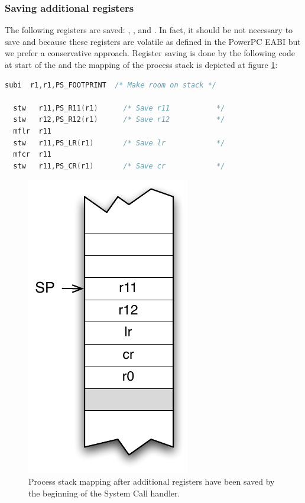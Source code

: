 
\subsubsection{Saving additional registers}

The following registers are saved: , ,  and . In fact, it should be not necessary to save  and  because these registers are volatile as defined in the PowerPC EABI \cite{PPCeabi} but we prefer a conservative approach. Register saving is done by the following code at start of the  and the mapping of the process stack is depicted at figure \ref{fig:stackSavingSC}:

\begin{lstlisting}[language=C]
  subi  r1,r1,PS_FOOTPRINT  /* Make room on stack */

  stw   r11,PS_R11(r1)      /* Save r11           */
  stw   r12,PS_R12(r1)      /* Save r12           */
  mflr  r11
  stw   r11,PS_LR(r1)       /* Save lr            */
  mfcr  r11
  stw   r11,PS_CR(r1)       /* Save cr            */
\end{lstlisting}

\begin{figure}[htbp] %
\begin{minipage}{0.5\textwidth}
    \centering
  \includegraphics[scale=.6]{pictures/PStackAfterSCSaving} 
\end{minipage}
\begin{minipage}{0.5\textwidth}
   \caption{Process stack mapping after additional registers have been saved by the beginning of the System Call handler.}\label{fig:stackSavingSC}
\end{minipage}
\end{figure}

